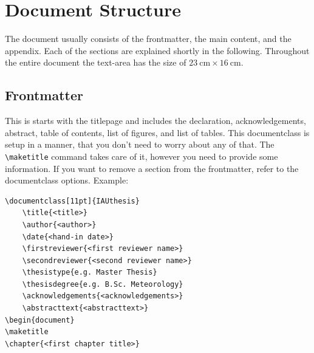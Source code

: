 \documentclass[12pt, todonotes, nodeclaration, oneside, fancypagenumbers, notof, notot, noabstract]{IAUthesis}
\newcommand{\code}[1]{\colorbox{black!10!white}{\texttt{#1}}}
\begin{document}
\section{Document Structure}
The document usually consists of the frontmatter, the main content, and the appendix. Each of the sections are explained shortly in the following. Throughout the entire document the text-area has the size of $\SI{23}{\centi\meter}\times\SI{16}{\centi\meter}$.
\subsection{Frontmatter}
This is starts with the titlepage and includes the declaration, acknowledgements, abstract, table of contents, list of figures, and list of tables. This documentclass is setup in a manner, that you don't need to worry about any of that. The \code{\textbackslash maketitle} command takes care of it, however you need to provide some information. If you want to remove a section from the frontmatter, refer to the documentclass options. Example:
\begin{verbatim}
\documentclass[11pt]{IAUthesis}
	\title{<title>}
	\author{<author>}
	\date{<hand-in date>}
	\firstreviewer{<first reviewer name>}
	\secondreviewer{<second reviewer name>}
	\thesistype{e.g. Master Thesis}
	\thesisdegree{e.g. B.Sc. Meteorology}
	\acknowledgements{<acknowledgements>}
	\abstracttext{<abstracttext>}
\begin{document}
\maketitle
\chapter{<first chapter title>}
\end{verbatim}
\end{document}
